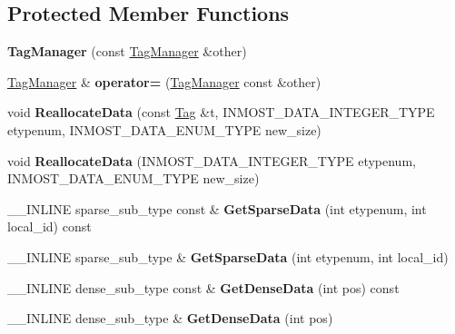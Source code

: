 \subsection*{Protected Member Functions}
\begin{DoxyCompactItemize}
\item 
\hypertarget{classINMOST_1_1TagManager_a74c7e50f03649a1b5041f524d0421079}{{\bfseries Tag\-Manager} (const \hyperlink{classINMOST_1_1TagManager}{Tag\-Manager} \&other)}\label{classINMOST_1_1TagManager_a74c7e50f03649a1b5041f524d0421079}

\item 
\hypertarget{classINMOST_1_1TagManager_ab128149e17df47b9ebfdb8c4997a46c4}{\hyperlink{classINMOST_1_1TagManager}{Tag\-Manager} \& {\bfseries operator=} (\hyperlink{classINMOST_1_1TagManager}{Tag\-Manager} const \&other)}\label{classINMOST_1_1TagManager_ab128149e17df47b9ebfdb8c4997a46c4}

\item 
\hypertarget{classINMOST_1_1TagManager_a60a6f61fd31686e47ddda096cd5a458b}{void {\bfseries Reallocate\-Data} (const \hyperlink{classINMOST_1_1Tag}{Tag} \&t, I\-N\-M\-O\-S\-T\-\_\-\-D\-A\-T\-A\-\_\-\-I\-N\-T\-E\-G\-E\-R\-\_\-\-T\-Y\-P\-E etypenum, I\-N\-M\-O\-S\-T\-\_\-\-D\-A\-T\-A\-\_\-\-E\-N\-U\-M\-\_\-\-T\-Y\-P\-E new\-\_\-size)}\label{classINMOST_1_1TagManager_a60a6f61fd31686e47ddda096cd5a458b}

\item 
\hypertarget{classINMOST_1_1TagManager_a397a04c1c4545b1152a438acc432f952}{void {\bfseries Reallocate\-Data} (I\-N\-M\-O\-S\-T\-\_\-\-D\-A\-T\-A\-\_\-\-I\-N\-T\-E\-G\-E\-R\-\_\-\-T\-Y\-P\-E etypenum, I\-N\-M\-O\-S\-T\-\_\-\-D\-A\-T\-A\-\_\-\-E\-N\-U\-M\-\_\-\-T\-Y\-P\-E new\-\_\-size)}\label{classINMOST_1_1TagManager_a397a04c1c4545b1152a438acc432f952}

\item 
\hypertarget{classINMOST_1_1TagManager_a3c7825981150daf50fb56d4f189e7c4e}{\-\_\-\-\_\-\-I\-N\-L\-I\-N\-E sparse\-\_\-sub\-\_\-type const \& {\bfseries Get\-Sparse\-Data} (int etypenum, int local\-\_\-id) const }\label{classINMOST_1_1TagManager_a3c7825981150daf50fb56d4f189e7c4e}

\item 
\hypertarget{classINMOST_1_1TagManager_ab95230b841496e62ea1a645b3d1336ce}{\-\_\-\-\_\-\-I\-N\-L\-I\-N\-E sparse\-\_\-sub\-\_\-type \& {\bfseries Get\-Sparse\-Data} (int etypenum, int local\-\_\-id)}\label{classINMOST_1_1TagManager_ab95230b841496e62ea1a645b3d1336ce}

\item 
\hypertarget{classINMOST_1_1TagManager_a029c2b2db435c0d325eb272b598816d6}{\-\_\-\-\_\-\-I\-N\-L\-I\-N\-E dense\-\_\-sub\-\_\-type const \& {\bfseries Get\-Dense\-Data} (int pos) const }\label{classINMOST_1_1TagManager_a029c2b2db435c0d325eb272b598816d6}

\item 
\hypertarget{classINMOST_1_1TagManager_af98cc766513cd82c1f0a99c78c5b8528}{\-\_\-\-\_\-\-I\-N\-L\-I\-N\-E dense\-\_\-sub\-\_\-type \& {\bfseries Get\-Dense\-Data} (int pos)}\label{classINMOST_1_1TagManager_af98cc766513cd82c1f0a99c78c5b8528}

\end{DoxyCompactItemize}
